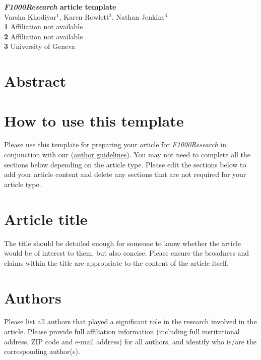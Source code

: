 \documentclass[10pt]{article}
\date{}
\begin{document}
\begin{flushleft}
{\LARGE
\textbf{\emph{F1000Research} article template}
}
\\
Varsha Khodiyar$^{1}$, Karen Rowlett$^{2}$, Nathan Jenkins$^{3}$
\\
{\bf 1} Affiliation not available
\\


{\bf 2} Affiliation not available
\\
{\bf 3} University of Geneva
\\
\end{flushleft}

\section*{Abstract}



\section*{How to use this template}
Please use this template for preparing your article for {\it F1000Research} in conjunction with our  (\href{http://f1000research.com/author-guidelines}{author guidelines}).
You may not need to complete all the sections below depending on the article type. 
Please edit the sections below to add your article content and delete any sections that are not required for your article type. 

\section*{Article title}
The title should be detailed enough for someone to know whether the article would be of interest to them, but also concise. Please ensure the broadness and claims within the title are appropriate to the content of the article itself.

\section*{Authors}
Please list all authors that played a significant role in the research involved in the article. Please provide full affiliation information (including full institutional address, ZIP code and e-mail address) for all authors, and identify who is/are the corresponding author(s).
\end{document}
